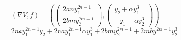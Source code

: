 \documentclass[12pt, a4paper]{report}
\begin{document}
\[ (\nabla V ,f )  = \left( \begin{pmatrix}
2a  n y^{2n -1 }_1 \\
2b  m y^{2m - 1 }  _2 
\end{pmatrix} , \begin{pmatrix}
y_2 + \alpha y_1 ^3 \\
-y_1+ \alpha y_2 ^3
\end{pmatrix}\right) =  \]  
\[ =2n a y_1 ^{2n -1 }  y_2 + 2n a y_1 ^{2n -1 }  \alpha y_1 ^3  + 2 bm y_2 ^{2m - 1 }  +2 m b y^{2 m- 1 } y_2 ^3\] 





\ifdefined\mainfile
\else
    
\end{document}

